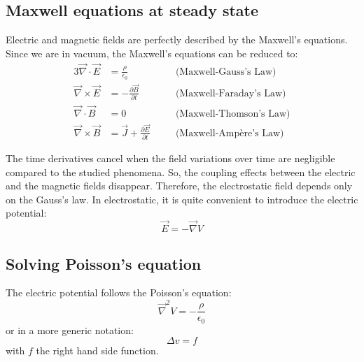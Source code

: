 \begin{refsection}

  \subsection{Maxwell equations at steady state}
  Electric and magnetic fields are perfectly described by the Maxwell's equations. Since we are in vacuum, the Maxwell's equations can be reduced to:
  \begin{alignat*}{3}
    \overrightarrow{\nabla} \cdot \overrightarrow{E}  & = \frac{\rho}{\epsilon_{0}}\quad                                           &  & \text{(Maxwell-Gauss's Law)}   \\
    \overrightarrow{\nabla} \times \overrightarrow{E} & = - \frac{\partial \overrightarrow{B}}{\partial t}\quad                    &  & \text{(Maxwell-Faraday's Law)} \\
    \overrightarrow{\nabla} \cdot \overrightarrow{B}  & = 0\quad                                                                   &  & \text{(Maxwell-Thomson's Law)} \\
    \overrightarrow{\nabla} \times \overrightarrow{B} & = \overrightarrow{J} + \frac{\partial \overrightarrow{E}}{\partial t}\quad &  & \text{(Maxwell-Ampère's Law)}
  \end{alignat*}

  The time derivatives cancel when the field variations over time are negligible compared to the studied phenomena. So, the coupling effects between the electric and the magnetic fields disappear. Therefore, the electrostatic field depends only on the Gauss’s law. In electrostatic, it is quite convenient to introduce the electric potential:
  \begin{equation}
    \vec{E} = - \vec{\nabla}V
  \end{equation}

  \subsection{Solving Poisson's equation}
  The electric potential follows the Poisson's equation:
  \begin{equation}
    \vec{\nabla}^{2}V = -\frac{\rho}{\epsilon_{0}}
  \end{equation}
  or in a more generic notation:
  \begin{equation}
    \Delta v = f
  \end{equation}
  with $f$ the right hand side function.


\end{refsection}
